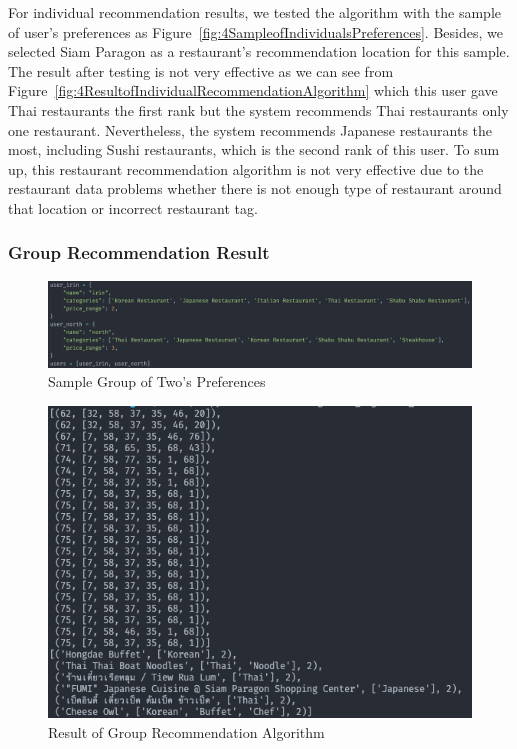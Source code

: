 \documentclass[12pt,oneside,openright,a4paper]{cpe-english-project}
\begin{document}
For individual recommendation results, we tested the algorithm with the sample of user’s preferences as Figure~\ref{fig:4SampleofIndividualsPreferences}. Besides, we selected Siam Paragon as a restaurant's recommendation location for this sample. The result after testing is not very effective as we can see from Figure~\ref{fig:4ResultofIndividualRecommendationAlgorithm} which this user gave Thai restaurants the first rank but the system recommends Thai restaurants only one restaurant. Nevertheless, the system recommends Japanese restaurants the most, including Sushi restaurants, which is the second rank of this user. To sum up, this restaurant recommendation algorithm is not very effective due to the restaurant data problems whether there is not enough type of restaurant around that location or incorrect restaurant tag.

\subsubsection{Group Recommendation Result}

\begin{figure}[H]\centering
\includegraphics[width=350pt]{./images/4SampleGroupofTwosPreferences.png}
\caption{Sample Group of Two’s Preferences}\label{fig:4SampleGroupofTwosPreferences}
\end{figure}

\begin{figure}[H]\centering
\includegraphics[width=350pt]{./images/4ResultofGroupRecommendationAlgorithm.png}
\caption{Result of Group Recommendation Algorithm}\label{fig:4ResultofGroupRecommendationAlgorithm}
\end{figure}
\end{document}
